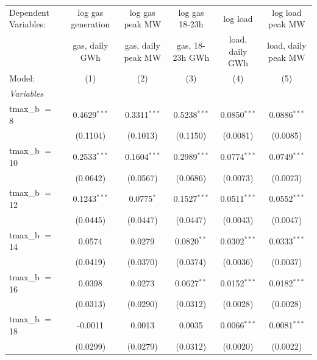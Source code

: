 
\begingroup
\centering
\begin{tabular}{lccccc}
   \tabularnewline \midrule \midrule
   Dependent Variables: & log gas generation & log gas peak MW    & log gas 18-23h  & log load        & log load peak MW\\  
                        & gas, daily GWh     & gas, daily peak MW & gas, 18-23h GWh & load, daily GWh & load, daily peak MW \\   
   Model:               & (1)                & (2)                & (3)             & (4)             & (5)\\  
   \midrule
   \emph{Variables}\\
   tmax\_b $=$ 8        & 0.4629$^{***}$     & 0.3311$^{***}$     & 0.5238$^{***}$  & 0.0850$^{***}$  & 0.0886$^{***}$\\   
                        & (0.1104)           & (0.1013)           & (0.1150)        & (0.0081)        & (0.0085)\\   
   tmax\_b $=$ 10       & 0.2533$^{***}$     & 0.1604$^{***}$     & 0.2989$^{***}$  & 0.0774$^{***}$  & 0.0749$^{***}$\\   
                        & (0.0642)           & (0.0567)           & (0.0686)        & (0.0073)        & (0.0073)\\   
   tmax\_b $=$ 12       & 0.1243$^{***}$     & 0.0775$^{*}$       & 0.1527$^{***}$  & 0.0511$^{***}$  & 0.0552$^{***}$\\   
                        & (0.0445)           & (0.0447)           & (0.0447)        & (0.0043)        & (0.0047)\\   
   tmax\_b $=$ 14       & 0.0574             & 0.0279             & 0.0820$^{**}$   & 0.0302$^{***}$  & 0.0333$^{***}$\\   
                        & (0.0419)           & (0.0370)           & (0.0374)        & (0.0036)        & (0.0037)\\   
   tmax\_b $=$ 16       & 0.0398             & 0.0273             & 0.0627$^{**}$   & 0.0152$^{***}$  & 0.0182$^{***}$\\   
                        & (0.0313)           & (0.0290)           & (0.0312)        & (0.0028)        & (0.0028)\\   
   tmax\_b $=$ 18       & -0.0011            & 0.0013             & 0.0035          & 0.0066$^{***}$  & 0.0081$^{***}$\\   
                        & (0.0299)           & (0.0279)           & (0.0312)        & (0.0020)        & (0.0022)\\   

\end{tabular}
